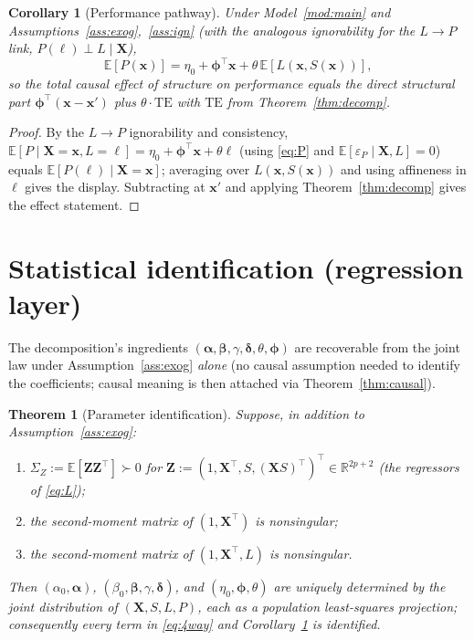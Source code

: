 \documentclass{amsart}
\theoremstyle{definition}
\theoremstyle{plain}
\newtheorem{theorem}{Theorem}
\newtheorem{corollary}{Corollary}
\begin{document}
\begin{corollary}[Performance pathway]\label{cor:perf}
Under Model~\ref{mod:main} and Assumptions~\ref{ass:exog},~\ref{ass:ign} (with the analogous
ignorability for the $L\to P$ link, $P(\ell)\perp L\mid\bm X$),
\[
\mathbb E[P(\bm x)]=\eta_0+\bm\phi^\top\bm x+\theta\,\mathbb E[L(\bm x,S(\bm x))],
\]
so the total causal effect of structure on performance equals the direct structural part
$\bm\phi^\top(\bm x-\bm x')$ plus $\theta\cdot\mathrm{TE}$ with $\mathrm{TE}$ from
Theorem~\ref{thm:decomp}.
\end{corollary}
\begin{proof}
By the $L\to P$ ignorability and consistency, $\mathbb E[P\mid\bm X=\bm x,L=\ell]
=\eta_0+\bm\phi^\top\bm x+\theta\ell$ (using \eqref{eq:P} and
$\mathbb E[\varepsilon_P\mid\bm X,L]=0$) equals $\mathbb E[P(\ell)\mid\bm X=\bm x]$; averaging
over $L(\bm x,S(\bm x))$ and using affineness in $\ell$ gives the display. Subtracting at
$\bm x'$ and applying Theorem~\ref{thm:decomp} gives the effect statement.
\end{proof}

\section{Statistical identification (regression layer)}

The decomposition's ingredients $(\bm\alpha,\bm\beta,\gamma,\bm\delta,\theta,\bm\phi)$ are
recoverable from the joint law under Assumption~\ref{ass:exog} \emph{alone} (no causal
assumption needed to identify the coefficients; causal meaning is then attached via
Theorem~\ref{thm:causal}).

\begin{theorem}[Parameter identification]\label{thm:ident}
Suppose, in addition to Assumption~\ref{ass:exog}:
\begin{enumerate}
\item[(R1)] $\Sigma_Z:=\mathbb E[\bm Z\bm Z^\top]\succ0$ for
$\bm Z:=(1,\bm X^\top,S,(\bm X S)^\top)^\top\in\mathbb R^{2p+2}$ (the regressors of
\eqref{eq:L});
\item[(R2)] the second-moment matrix of $(1,\bm X^\top)$ is nonsingular;
\item[(R3)] the second-moment matrix of $(1,\bm X^\top,L)$ is nonsingular.
\end{enumerate}
Then $(\alpha_0,\bm\alpha)$, $(\beta_0,\bm\beta,\gamma,\bm\delta)$, and
$(\eta_0,\bm\phi,\theta)$ are uniquely determined by the joint distribution of
$(\bm X,S,L,P)$, each as a population least-squares projection; consequently every term in
\eqref{eq:4way} and Corollary~\ref{cor:perf} is identified.
\end{theorem}
\end{document}
